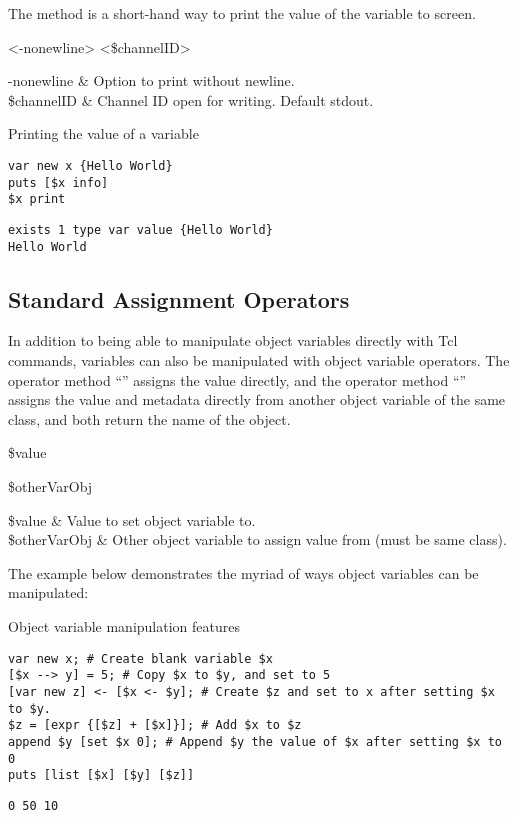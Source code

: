 \documentclass{article}
\begin{document}
The method  is a short-hand way to print the value of the variable to screen.
\begin{syntax}
 <-nonewline> <\$channelID>
\end{syntax}
\begin{args}
-nonewline & Option to print without newline. \\
\$channelID & Channel ID open for writing. Default stdout.
\end{args}
\begin{example}{Printing the value of a variable}
\begin{lstlisting}
var new x {Hello World}
puts [$x info]
$x print
\end{lstlisting}
\tcblower
\begin{lstlisting}
exists 1 type var value {Hello World}
Hello World
\end{lstlisting}
\end{example}


\clearpage
\subsection{Standard Assignment Operators}
In addition to being able to manipulate object variables directly with Tcl commands, variables can also be manipulated with object variable operators.
The operator method ``\texttt{}'' assigns the value directly, and the operator method ``\texttt{}'' assigns the value and metadata directly from another object variable of the same class, and both return the name of the object.
\begin{syntax}
 \$value
\end{syntax}
\begin{syntax}
 \$otherVarObj 
\end{syntax}
\begin{args}
\$value & Value to set object variable to. \\
\$otherVarObj & Other object variable to assign value from (must be same class).
\end{args}

The example below demonstrates the myriad of ways object variables can be manipulated:
\begin{example}{Object variable manipulation features}
\begin{lstlisting}
var new x; # Create blank variable $x
[$x --> y] = 5; # Copy $x to $y, and set to 5
[var new z] <- [$x <- $y]; # Create $z and set to x after setting $x to $y.
$z = [expr {[$z] + [$x]}]; # Add $x to $z
append $y [set $x 0]; # Append $y the value of $x after setting $x to 0
puts [list [$x] [$y] [$z]]
\end{lstlisting}
\tcblower
\begin{lstlisting}
0 50 10
\end{lstlisting}
\end{example}
\end{document}

